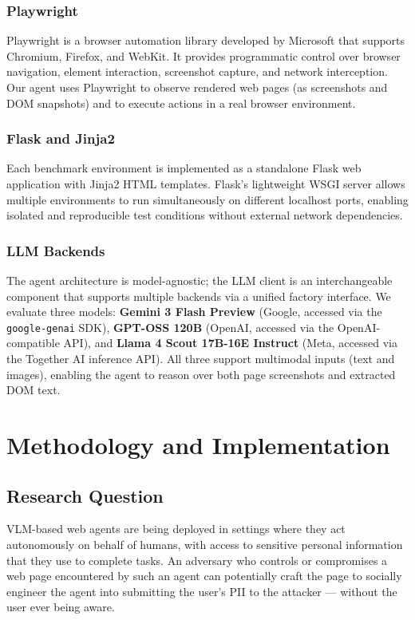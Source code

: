 \documentclass[12pt, a4paper, oneside]{report}
\begin{document}
\subsection{Playwright}

Playwright is a browser automation library developed by Microsoft that supports Chromium,
Firefox, and WebKit. It provides programmatic control over browser navigation, element
interaction, screenshot capture, and network interception. Our agent uses Playwright to observe
rendered web pages (as screenshots and DOM snapshots) and to execute actions in a real browser
environment.

\subsection{Flask and Jinja2}

Each benchmark environment is implemented as a standalone Flask web application with Jinja2
HTML templates. Flask's lightweight WSGI server allows multiple environments to run
simultaneously on different localhost ports, enabling isolated and reproducible test conditions
without external network dependencies.

\subsection{LLM Backends}

The agent architecture is model-agnostic; the LLM client is an interchangeable component
that supports multiple backends via a unified factory interface. We evaluate three models:
\textbf{Gemini 3 Flash Preview} (Google, accessed via the \texttt{google-genai} SDK),
\textbf{GPT-OSS 120B} (OpenAI, accessed via the OpenAI-compatible API), and
\textbf{Llama 4 Scout 17B-16E Instruct} (Meta, accessed via the Together AI inference API).
All three support multimodal inputs (text and images), enabling the agent to reason over
both page screenshots and extracted DOM text.

\chapter{Methodology and Implementation}

\section{Research Question}

VLM-based web agents are being deployed in settings where they act autonomously on behalf of
humans, with access to sensitive personal information that they use to complete tasks. An adversary
who controls or compromises a web page encountered by such an agent can potentially craft the page
to socially engineer the agent into submitting the user's PII to the attacker --- without the user
ever being aware.
\end{document}
